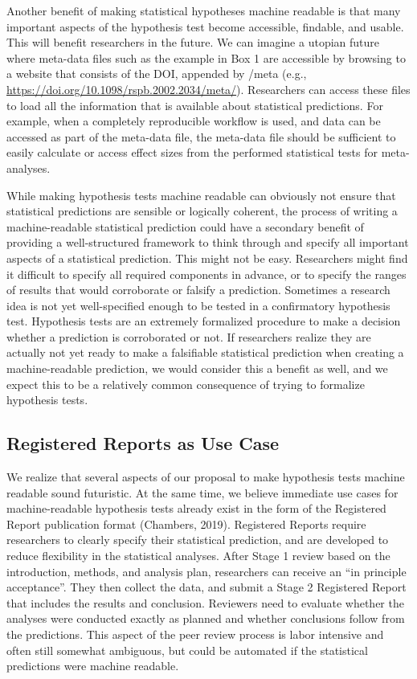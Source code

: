 \documentclass[english,doc,floatsintext]{apa6}
\begin{document}
Another benefit of making statistical hypotheses machine readable is that many important aspects of the hypothesis test become accessible, findable, and usable. This will benefit researchers in the future. We can imagine a utopian future where meta-data files such as the example in Box 1 are accessible by browsing to a website that consists of the DOI, appended by /meta (e.g., \url{https://doi.org/10.1098/rspb.2002.2034/meta/}). Researchers can access these files to load all the information that is available about statistical predictions. For example, when a completely reproducible workflow is used, and data can be accessed as part of the meta-data file, the meta-data file should be sufficient to easily calculate or access effect sizes from the performed statistical tests for meta-analyses.

While making hypothesis tests machine readable can obviously not ensure that statistical predictions are sensible or logically coherent, the process of writing a machine-readable statistical prediction could have a secondary benefit of providing a well-structured framework to think through and specify all important aspects of a statistical prediction. This might not be easy. Researchers might find it difficult to specify all required components in advance, or to specify the ranges of results that would corroborate or falsify a prediction. Sometimes a research idea is not yet well-specified enough to be tested in a confirmatory hypothesis test. Hypothesis tests are an extremely formalized procedure to make a decision whether a prediction is corroborated or not. If researchers realize they are actually not yet ready to make a falsifiable statistical prediction when creating a machine-readable prediction, we would consider this a benefit as well, and we expect this to be a relatively common consequence of trying to formalize hypothesis tests.

\hypertarget{registered-reports-as-use-case}{%
\subsection{Registered Reports as Use Case}\label{registered-reports-as-use-case}}

We realize that several aspects of our proposal to make hypothesis tests machine readable sound futuristic. At the same time, we believe immediate use cases for machine-readable hypothesis tests already exist in the form of the Registered Report publication format (Chambers, 2019). Registered Reports require researchers to clearly specify their statistical prediction, and are developed to reduce flexibility in the statistical analyses. After Stage 1 review based on the introduction, methods, and analysis plan, researchers can receive an \enquote{in principle acceptance}. They then collect the data, and submit a Stage 2 Registered Report that includes the results and conclusion. Reviewers need to evaluate whether the analyses were conducted exactly as planned and whether conclusions follow from the predictions. This aspect of the peer review process is labor intensive and often still somewhat ambiguous, but could be automated if the statistical predictions were machine readable.
\end{document}
